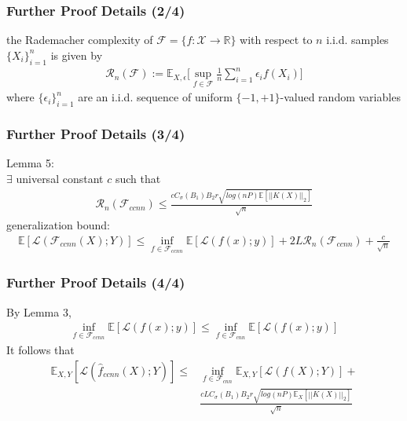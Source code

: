 \documentclass[hyperref={colorlinks}]{beamer}
\begin{document}
\begin{frame}
	\frametitle{Further Proof Details (2/4)}
	the Rademacher complexity of $\mathcal{F}=\{f:\mathcal{X}\rightarrow \mathbb{R}\}$ with respect to $n$ i.i.d. samples $\{X_i\}_{i=1}^n$ is given by
	\begin{align*}
	\mathcal{R}_n(\mathcal{F}):=\mathbb{E}_{X,\epsilon} \bigg[\sup\limits_{f\in\mathcal{F}} \frac{1}{n}\sum\limits_{i=1}^n \epsilon_i f(X_i)\bigg]
	\end{align*}
	where $\{\epsilon_i\}_{i=1}^n$ are an i.i.d. sequence of uniform $\{-1,+1\}$-valued random variables
\end{frame}

\begin{frame}
	\frametitle{Further Proof Details (3/4)}
	Lemma 5: \\
	$\exists$ universal constant $c$ such that 
	\begin{align*}
		\mathcal{R}_n(\mathcal{F}_{ccnn})\leq \frac{cC_{\sigma}(B_1)B_2r\sqrt{log(nP)\mathbb{E}[||K(X)||_2]}}{\sqrt{n}}
	\end{align*}
	generalization bound:
	\begin{align*}
		\mathbb{E}[\mathcal{L}(\mathcal{F}_{ccnn}(X);Y)]\leq \inf\limits_{f\in \mathcal{F}_{ccnn}} \mathbb{E}[\mathcal{L}(f(x);y)]+2L\mathcal{R}_n(\mathcal{F}_{ccnn})+\frac{c}{\sqrt{n}}
	\end{align*}
\end{frame}

\begin{frame}
	\frametitle{Further Proof Details (4/4)}
	By Lemma 3,
	\begin{align*}
	\inf\limits_{f\in \mathcal{F}_{ccnn}} \mathbb{E}[\mathcal{L}(f(x);y)] \leq \inf\limits_{f\in \mathcal{F}_{cnn}} \mathbb{E}[\mathcal{L}(f(x);y)]
	\end{align*}
	It follows that
	\begin{align*}
	\mathbb{E}_{X,Y}[\mathcal{L}(\hat{f}_{ccnn}(X);Y)]\leq 
	&\inf\limits_{f\in \mathcal{F}_{cnn}} \mathbb{E}_{X,Y}[\mathcal{L}(f(X);Y)]+ \\ &\frac{cLC_{\sigma}(B_1)B_2 r\sqrt{log(nP)\mathbb{E}_X[||K(X)||_2]}}{\sqrt{n}}
	\end{align*}
\end{frame}
\end{document}
